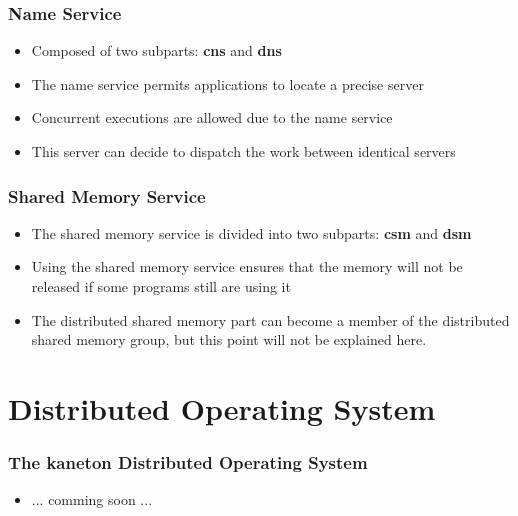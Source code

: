 \documentclass[8pt]{beamer}
\begin{document}

\begin{frame}
  \frametitle{Name Service}

  \begin{itemize}
    \item
      Composed of two subparts: \textbf{cns} and \textbf{dns}
    \item
      The name service permits applications to locate a precise server
    \item
      Concurrent executions are allowed due to the name service
    \item
      This server can decide to dispatch the work between identical servers
  \end{itemize}
\end{frame}


\begin{frame}
  \frametitle{Shared Memory Service}

  \begin{itemize}[<+->]
    \item
      The shared memory service is divided into two subparts:
      \textbf{csm} and \textbf{dsm}
    \item
      Using the shared memory service ensures that the memory will not
      be released if some programs still are using it
    \item
      The distributed shared memory part can become a member of the
      distributed shared memory group, but this point will not be
      explained here.
  \end{itemize}
\end{frame}

%
%

\section{Distributed Operating System}

\begin{frame}
  \frametitle{The kaneton Distributed Operating System}

  \begin{itemize}[<+->]
    \item ... comming soon ...
  \end{itemize}
\end{frame}
\end{document}
